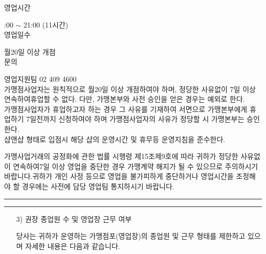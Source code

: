\documentclass[a5paper,10pt]{oblivoir}
\newcommand\crule[3][black]{\textcolor{#1}{\rule{#2}{#3}}}
\begin{document}
\begin{enumerate}
\begin{enumerate}
\rule{0cm}{0.5cm}

\begin{tiny}
\begin{Form}
\def\LayoutCheckField#1#2{%
  \parbox[c][5mm]{5mm}{\centering\footnotesize\strut #1\\#2}%
}
\def\LayoutCheckField#1#2{%
  \makebox[0pt][l]{%
    \makebox[5mm][c]{\footnotesize\strut #1}%
  }%
  #2%
}
\def\DefaultHeightofCheckBox{5mm}
\def\DefaultWidthofCheckBox{5mm}


  영업시간

\noindent{}:00 $\sim$ 21:00 (11시간)
\\

 영업일수

\noindent\dotfill 
 월20일 이상 개점
\\

 문의

\noindent\dotfill 
 영업지원팀 02 409 4600
\\

\noindent\dotfill 
가맹점사업자는 원칙적으로 월20일 이상 개점하여야 하며, 정당한 사유없이 7일 이상 연속하여휴업할 수 없다. 다만, 가맹본부와 사전 승인을 얻은 경우는 예외로 한다.
\\

\noindent\dotfill 
가맹점사업자가 휴업하고자 하는 경우 그 사유를 기재하여 서면으로 가맹본부에게 휴업하기 7일전까지 신청하여야 하며 가맹점사업자의 사유가 정당할 시 가맹본부는 승인한다.
\\

\noindent\dotfill 
샵앤샵 형태로 입점시 해당 샵의 운영시간 및 휴무등 운영지침을 준수한다.
\end{Form}
\end{tiny}

가맹사업거래의 공정화에 관한 법률 시행령 제15조제9호에 따라 귀하가 정당한 사유없이 연속하여7일 이상 영업을 중단한 경우 가맹계약 해지가 될 수 있으므로 주의하시기 바랍니다.귀하가 개인 사정 등으로 영업을 불가피하게 중단하거나 영업시간을 조정해야 할 경우에는 사전에 담당 영업팀 통지하시기 바랍니다.
\end{enumerate}
\newpage
\begin{center}
\crule[red]{4cm}{0.1cm} \crule[blue]{4cm}{0.1cm}
\end{center}
\begin{enumerate}
\item[3)] 권장 종업원 수 및 영업장 근무 여부

당사는 귀하가 운영하는 가맹점포(영업장)의 종업원 및 근무 형태를 제한하고 있으며 자세한 내용은 다음과 같습니다.


\end{enumerate}
\end{enumerate}
\end{document}
